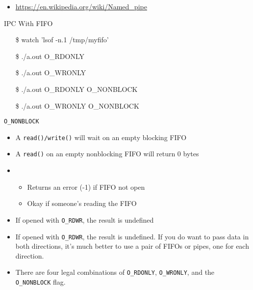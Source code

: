 \begin{itemize}
\item \url{https://en.wikipedia.org/wiki/Named_pipe}
\end{itemize}

\begin{frame}{IPC With FIFO}
\end{frame}

\begin{frame}
  {\ttfamily
    \begin{itemize}
    \item[\$] watch 'lsof -n.1 /tmp/myfifo'
    \item[\$] ./a.out O\_RDONLY
    \item[\$] ./a.out O\_WRONLY
    \item[\$] ./a.out O\_RDONLY O\_NONBLOCK
    \item[\$] ./a.out O\_WRONLY O\_NONBLOCK
    \end{itemize}}
  \begin{block}{\texttt{O\_NONBLOCK}}
    \begin{itemize}
    \item A \texttt{read()/write()} will wait on an empty blocking FIFO
    \item A \texttt{read()} on an empty nonblocking FIFO will return 0 bytes
    \item {}
      \begin{itemize}
      \item Returns an error (-1) if FIFO not open
      \item Okay if someone's reading the FIFO
      \end{itemize}
    \item If opened with \texttt{O\_RDWR}, the result is undefined
    \end{itemize}
  \end{block}
\end{frame}

\begin{itemize}
\item If opened with \texttt{O\_RDWR}, the result is undefined. If you do want to pass
  data in both directions, it's much better to use a pair of FIFOs or pipes, one for each
  direction.
\item There are four legal combinations of \texttt{O\_RDONLY}, \texttt{O\_WRONLY}, and the
  \texttt{O\_NONBLOCK} flag. 
\end{itemize}
\begin{longlisting}
\end{longlisting}

